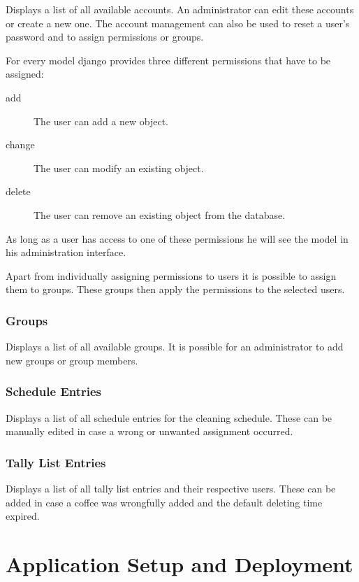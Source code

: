 Displays a list of all available accounts. An administrator can edit
these accounts or create a new one. The account management can also be
used to reset a user's password and to assign permissions or groups.

For every model django provides three different permissions that have to
be assigned:

\begin{description}
\item[add] The user can add a new object.
\item[change] The user can modify an existing object.
\item[delete] The user can remove an existing object from the
database.
\end{description}

As long as a user has access to one of these permissions he will see the
model in his administration interface.

Apart from individually assigning permissions to users it is possible to
assign them to groups. These groups then apply the permissions to the
selected users.

\subsubsection{Groups}\label{groups}

Displays a list of all available groups. It is possible for an
administrator to add new groups or group members.

\subsubsection{Schedule Entries}\label{schedule-entries}

Displays a list of all schedule entries for the cleaning schedule. These
can be manually edited in case a wrong or unwanted assignment occurred.

\subsubsection{Tally List Entries}\label{tally-list-entries}

Displays a list of all tally list entries and their respective users.
These can be added in case a coffee was wrongfully added and the default
deleting time expired.

\newpage
\newpage
\section{Application Setup and
Deployment}\label{application-setup-and-deployment}

